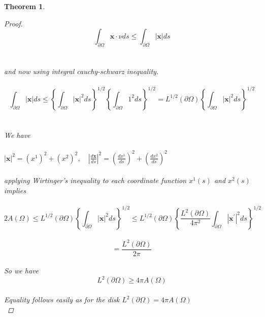 \documentclass[oneside]{book}
\newtheorem{theorem}{Theorem}[section]
\begin{document}
\begin{theorem}
\begin{proof}
$$ \int_{\partial \Omega} \mathbf{x} \cdot \nu d s \leq \int_{\partial \Omega} | \mathbf{x}| d s  $$ 
\\\\
and now using integral cauchy-schwarz inequality. \\\\
$$\int_{\partial \Omega}|\mathbf{x}| d s \leq\left\{\int_{\partial \Omega}|\mathbf{x}|^{2} d s\right\}^{1 / 2}\left\{\int_{\partial \Omega} 1^{2} d s\right\}^{1 / 2} =L^{1 / 2}(\partial \Omega)\left\{\int_{\partial \Omega}|\mathbf{x}|^{2} d s\right\}^{1 / 2}$$ \\\\
We have \\\\
$|\mathbf{x}|^{2} = \left(x^{1}\right)^{2}+\left(x^{2}\right)^{2}, \quad\left|\frac{d \mathbf{x}}{d s}\right|^{2}=\left(\frac{d x^{1}}{d s}\right)^{2}+\left(\frac{d x^{2}}{d s}\right)^{2}$\\\\
applying Wirtinger's inequality to each coordinate function $x^{1}(s)$ and $x^{2}(s)$ implies \\\\
$$ 2 A(\Omega) \leq L^{1 / 2}(\partial \Omega)\left\{\int_{\partial \Omega}|\mathbf{x}|^{2} d s\right\}^{1 / 2} \leq L^{1 / 2}(\partial \Omega)\left\{\frac{L^{2}(\partial \Omega)}{4 \pi^{2}} \int_{\partial \Omega}\left|\mathbf{x}^{\prime}\right|^{2} d s\right\}^{1 / 2}$$
\\
$$=\frac{L^{2}(\partial \Omega)}{2 \pi}$$ \\
So we have $$L^{2}(\partial \Omega) \geq 4 \pi A(\Omega)$$\\
Equality follows easily as for the disk $L^{2}(\partial \Omega) = 4 \pi A(\Omega)$ \\

\end{proof}
\end{theorem}







   
\end{document}
